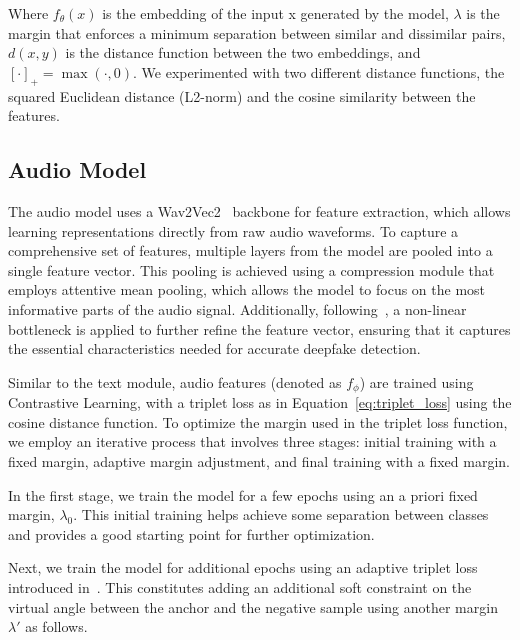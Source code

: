 \documentclass{Interspeech}
\begin{document}
Where $f_\theta(x)$ is the embedding of the input x generated by the model,
$\lambda$ is the margin that enforces a minimum separation between similar and
dissimilar pairs, $d(x,y)$ is the distance function between the two embeddings,
and $[\cdot]_{+} = \max(\cdot, 0)$. We experimented with two different distance
functions, the squared Euclidean distance (L2-norm) and the cosine similarity
between the features.

\subsection{Audio Model}

The audio model uses a Wav2Vec2~\cite{wav2vec2} backbone for feature
extraction, which allows learning representations directly from raw audio
waveforms. To capture a comprehensive set of features, multiple layers from the
model are pooled into a single feature vector. This pooling is achieved using a
compression module that employs attentive mean pooling, which allows the model
to focus on the most informative parts of the audio signal. Additionally,
following~\cite{slim}, a non-linear bottleneck is applied to further refine the
feature vector, ensuring that it captures the essential characteristics needed
for accurate deepfake detection.
% 


Similar to the text module, audio features (denoted as $f_{\phi}$) are trained
using Contrastive Learning, with a triplet loss as in
Equation~\ref{eq:triplet_loss} using the cosine distance function. To optimize
the margin used in the triplet loss function, we employ an iterative process
that involves three stages: initial training with a fixed margin, adaptive
margin adjustment, and final training with a fixed margin.

In the first stage, we train the model for a few epochs using an a priori fixed
margin, $\lambda_0$. This initial training helps achieve some separation
between classes and provides a good starting point for further optimization.

Next, we train the model for additional epochs using an adaptive triplet loss
introduced in~\cite{adatriplet}.
This constitutes adding an additional soft constraint on the virtual angle
between the anchor and the negative sample using another margin $\lambda'$ as
follows.
\end{document}
